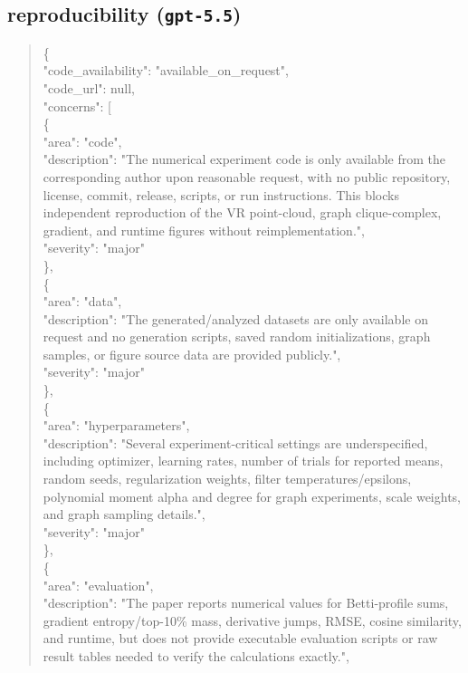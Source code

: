 \documentclass[11pt]{article}
\begin{document}
\subsection*{reproducibility (\texttt{gpt-5.5})}
\begin{quote}\small\ttfamily\raggedright
\{\\
  "code\_availability": "available\_on\_request",\\
  "code\_url": null,\\
  "concerns": [\\
    \{\\
      "area": "code",\\
      "description": "The numerical experiment code is only available from the corresponding author upon reasonable request, with no public repository, license, commit, release, scripts, or run instructions. This blocks independent reproduction of the VR point-cloud, graph clique-complex, gradient, and runtime figures without reimplementation.",\\
      "severity": "major"\\
    \},\\
    \{\\
      "area": "data",\\
      "description": "The generated/analyzed datasets are only available on request and no generation scripts, saved random initializations, graph samples, or figure source data are provided publicly.",\\
      "severity": "major"\\
    \},\\
    \{\\
      "area": "hyperparameters",\\
      "description": "Several experiment-critical settings are underspecified, including optimizer, learning rates, number of trials for reported means, random seeds, regularization weights, filter temperatures/epsilons, polynomial moment alpha and degree for graph experiments, scale weights, and graph sampling details.",\\
      "severity": "major"\\
    \},\\
    \{\\
      "area": "evaluation",\\
      "description": "The paper reports numerical values for Betti-profile sums, gradient entropy/top-10\% mass, derivative jumps, RMSE, cosine similarity, and runtime, but does not provide executable evaluation scripts or raw result tables needed to verify the calculations exactly.",\\

\end{quote}
\end{document}
